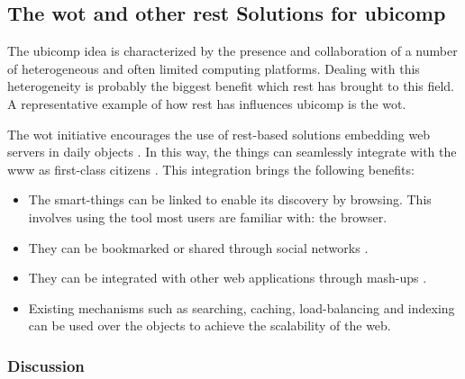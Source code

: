 \subsection{The \acl{wot} and other \ac{rest} Solutions for \acs{ubicomp}}

The \ac{ubicomp} idea is characterized by the presence and collaboration of a number of heterogeneous and often limited computing platforms.
Dealing with this heterogeneity is probably the biggest benefit which \ac{rest} has brought to this field.
A representative example of how \ac{rest} has influences \ac{ubicomp} is the \acf{wot}.




The \acl{wot} initiative encourages the use of \acs{rest}-based solutions embedding web servers in daily objects \citep{guinard_internet_2011,guinard_thesis_2011}.
In this way, the things can seamlessly integrate with the \ac{www} as first-class citizens \citep{gupta_network_2011}. %
This integration brings the following benefits:
\begin{itemize}
  \item The smart-things can be linked to enable its discovery by browsing.
	This involves using the tool most users are familiar with: the browser.
  \item They can be bookmarked or shared through social networks \citep{guinard_sharing_2010}.
  \item They can be integrated with other web applications through mash-ups \citep{guinard_towards_2009,ostermaier_webplug:_2010,pintus_anatomy_2011}.
  \item Existing mechanisms such as searching, caching, load-balancing and indexing can be used over the objects to achieve the scalability of the web. %
\end{itemize}




\subsubsection{Discussion}



